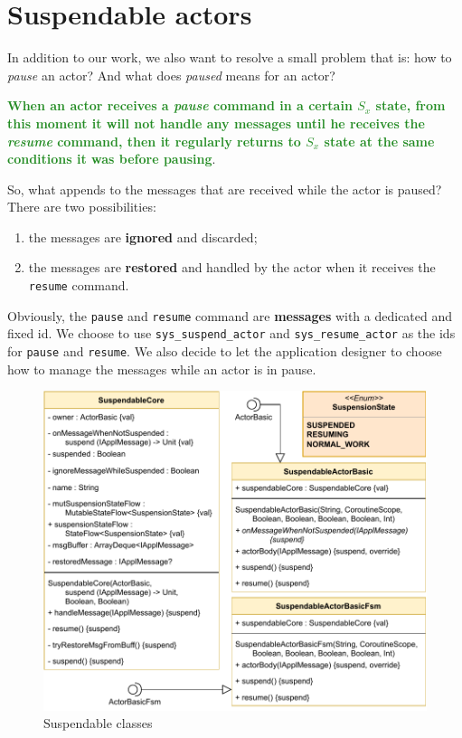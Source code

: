 \section{Suspendable actors}

In addition to our work, we also want to resolve a small problem that is: how to \textit{pause} an actor? And what does \textit{paused} means for an actor?

\textcolor{ForestGreen}{\textbf{When an actor receives a \textit{pause} command in a certain $S_x$ state, from this moment it will not handle any messages until he receives the \textit{resume} command, then it regularly returns to $S_x$ state at the same conditions it was before pausing}}.

So, what appends to the messages that are received while the actor is paused? There are two possibilities:
\begin{enumerate}
	\item the messages are \textbf{ignored} and discarded;
	\item the messages are \textbf{restored} and handled by the actor when it receives the \texttt{resume} command.
\end{enumerate}

Obviously, the \texttt{pause} and \texttt{resume} command are \textbf{messages} with a dedicated and fixed id. We choose to use \texttt{sys\_suspend\_actor} and \texttt{sys\_resume\_actor} as the ids for \texttt{pause} and \texttt{resume}.
We also decide to let the application designer to choose how to manage the messages while an actor is in pause.

\begin{figure}[h!]
	\centering
	\includegraphics[width=\textwidth]{img/[UML]Suspendable}
	\caption{Suspendable classes}
	\label{fig::suspendable}
\end{figure}

